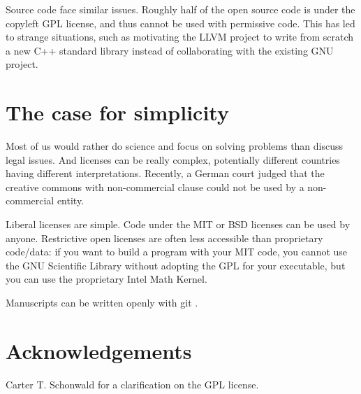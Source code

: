 \documentclass[letterpaper]{article}
\begin{document}
Source code face similar issues. Roughly half of the open source code is
under the copyleft GPL license, and thus cannot be used with permissive
code. This has led to strange situations, such as motivating the LLVM project
to write from scratch a new C++ standard library instead of collaborating
with the existing GNU project.


\section{The case for simplicity}

Most of us would rather do science and focus on solving problems than discuss
legal issues.  And licenses can be really complex, potentially different
countries having different interpretations. Recently, a German court judged
that the creative commons with non-commercial clause could not be used by
a non-commercial entity. %

Liberal licenses are simple. Code under the MIT or BSD licenses can be used by
anyone. Restrictive open licenses are often less accessible than proprietary
code/data: if you want to build a program with your MIT code, you cannot use
the GNU Scientific Library without adopting the GPL for your executable, but
you can use the proprietary Intel Math Kernel.

Manuscripts can be written openly with git \cite{ram13}.

\section{Acknowledgements}

Carter T. Schonwald for a clarification on the GPL license.



\end{document}
